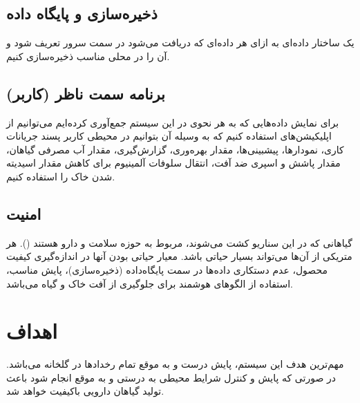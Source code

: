 \documentclass[a4paper]{report}
\begin{document}
\subsection*{ذخیره‌سازی و پایگاه داده}

یک ساختار داده‌ای به ازای هر داده‌ای که دریافت می‌شود در سمت سرور تعریف شود و آن
را در محلی مناسب ذخیره‌سازی کنیم.

\subsection*{برنامه سمت ناظر (کاربر)}

برای نمایش داده‌هایی که به هر نحوی در این سیستم جمع‌آوری کرده‌ایم می‌توانیم از
اپلیکیشن‌های  استفاده کنیم که به وسیله آن بتوانیم در محیطی کاربر
پسند جریانات کاری، نمودار‌ها، پیشبینی‌ها، مقدار بهره‌وری، گزارش‌گیری، مقدار آب
مصرفی گیاهان، مقدار پاشش و اسپری ضد آفت، انتقال سلوفات آلمینیوم برای کاهش مقدار
اسیدیته شدن خاک را استفاده کنیم.

\subsection*{امنیت}

گیاهانی که در این سناریو کشت می‌شوند، مربوط به حوزه سلامت و دارو هستند
(). هر متریکی از آن‌ها می‌تواند بسیار حیاتی باشد. معیار
حیاتی بودن آنها در اندازه‌گیری کیفیت محصول، عدم دستکاری داده‌ها در سمت
پایگاه‌داده (ذخیره‌سازی)، پایش مناسب، استفاده از الگو‌های هوشمند برای جلوگیری از
آفت خاک و گیاه می‌باشد.

\section*{اهداف}

مهم‌ترین هدف این سیستم، پایش درست و به موقع تمام رخدادها در گلخانه می‌باشد. در
صورتی که پایش و کنترل شرایط محیطی به درستی و به موقع انجام شود باعث تولید گیاهان
دارویی باکیفیت خواهد شد.
\end{document}
